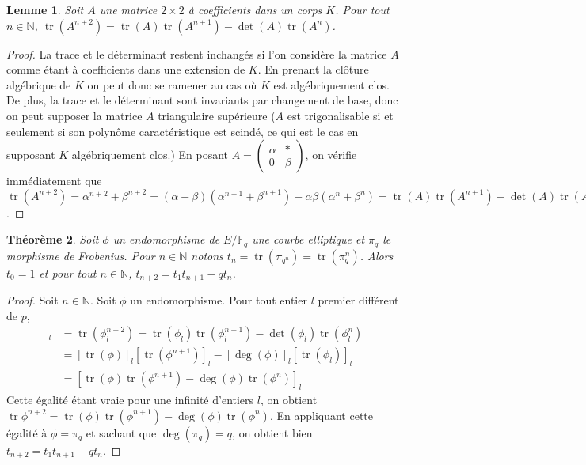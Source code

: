 \documentclass{article}
\theoremstyle{plain}%
\newtheorem{thm}{Théorème}[section]
\newtheorem{lem}[thm]{Lemme}
\theoremstyle{definition}%
\newcommand{\F}{\mathbb{F}}
\newcommand{\N}{\mathbb{N}}
\DeclareMathOperator{\tr}{tr}
\begin{document}
\begin{lem}
  Soit $A$ une matrice $2\times 2$ à coefficients dans un corps $K$. Pour tout $n\in\N$, $\tr(A^{n+2}) = \tr(A)\tr(A^{n+1}) - \det(A)\tr(A^n)$.
\end{lem}

\begin{proof}
  La trace et le déterminant restent inchangés si l'on considère la matrice $A$ comme étant à coefficients dans une extension de $K$. En prenant la clôture algébrique de $K$ on peut donc se ramener au cas où $K$ est algébriquement clos. De plus, la trace et le déterminant sont invariants par changement de base, donc on peut supposer la matrice $A$ triangulaire supérieure ($A$ est trigonalisable si et seulement si son polynôme caractéristique est scindé, ce qui est le cas en supposant $K$ algébriquement clos.) En posant $A = \begin{pmatrix} \alpha & * \\ 0 & \beta \end{pmatrix}$, on vérifie immédiatement que $\tr(A^{n+2}) = \alpha^{n+2} + \beta^{n+2} = (\alpha + \beta)(\alpha^{n+1} + \beta^{n+1}) - \alpha\beta(\alpha^n + \beta^n) = \tr(A)\tr(A^{n+1}) - \det(A)\tr(A^n)$.
\end{proof}

\begin{thm}
  \label{récurrence}
  Soit $\phi$ un endomorphisme de $E/\F_q$ une courbe elliptique et $\pi_q$ le morphisme de Frobenius. Pour $n\in\N$ notons $t_n = \tr(\pi_{q^n}) = \tr(\pi_q^n)$. Alors $t_0=1$ et pour tout $n\in\N$, $t_{n+2} = t_1t_{n+1} - qt_n$.
\end{thm}

\begin{proof}
  Soit $n\in\N$. Soit $\phi$ un endomorphisme. Pour tout entier $l$ premier différent de $p$, 
  \begin{align*} 
    [\tr\phi^{n+2}]_l 
    &= \tr(\phi_l^{n+2}) 
    = \tr(\phi_l)\tr(\phi_l^{n+1})-\det(\phi_l)\tr(\phi_l^n) \\
    &= [\tr(\phi)]_l [\tr(\phi^{n+1})]_l-[\deg(\phi)]_l[\tr(\phi_l)]_l \\
    &= [\tr(\phi)\tr(\phi^{n+1})-\deg(\phi)\tr(\phi^n)]_l 
  \end{align*}
  Cette égalité étant vraie pour une infinité d'entiers $l$, on obtient $\tr\phi^{n+2} =  \tr(\phi)\tr(\phi^{n+1})-\deg(\phi)\tr(\phi^n)$. En appliquant cette égalité à $\phi = \pi_q$ et sachant que $\deg(\pi_q)=q$, on obtient bien $t_{n+2} = t_1t_{n+1}-qt_n$. 

\end{proof}
\end{document}
